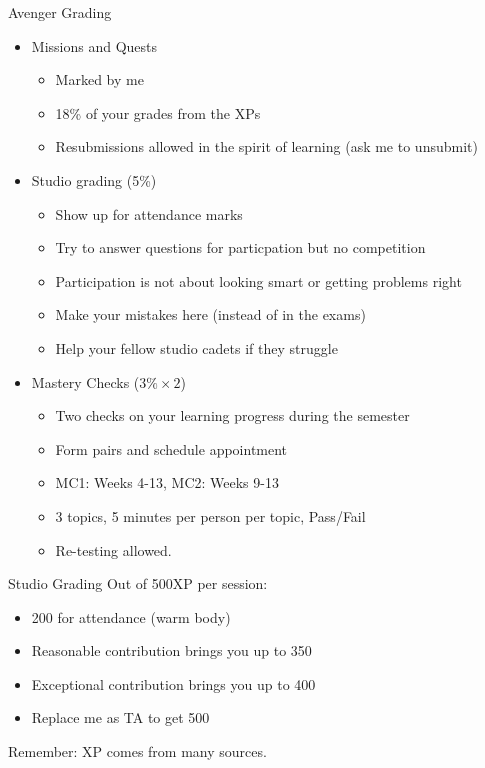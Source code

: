 \documentclass[10pt]{beamer}
\begin{document}
\begin{frame}[fragile]{Avenger Grading}
  \begin{itemize}
    \item Missions and Quests 
    \begin{itemize}
      \item Marked by me
      \item 18\% of your grades from the XPs
      \item Resubmissions allowed in the spirit of learning (ask me to unsubmit)
    \end{itemize}
    \item Studio grading (5\%)
    \begin{itemize}
      \item Show up for attendance marks
      \item Try to answer questions for particpation but no competition
      \item Participation is not about looking smart or getting problems right
      \item Make your mistakes here (instead of in the exams)
      \item Help your fellow studio cadets if they struggle
    \end{itemize}
    \item Mastery Checks ($3\% \times 2$)
    \begin{itemize}
      \item Two checks on your learning progress during the semester
      \item Form pairs and schedule appointment
      \item MC1: Weeks 4-13, MC2: Weeks 9-13
      \item 3 topics, 5 minutes per person per topic, Pass/Fail
      \item Re-testing allowed.
    \end{itemize}
  \end{itemize}
\end{frame}

\begin{frame}[fragile]{Studio Grading}
Out of 500XP per session:
  \begin{itemize}
    \item 200 for attendance (warm body)
    \item Reasonable contribution brings you up to 350
    \item Exceptional contribution brings you up to 400
    \item Replace me as TA to get 500
  \end{itemize}
Remember: XP comes from many sources.
\end{frame}
\end{document}
